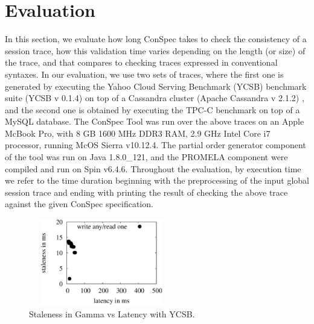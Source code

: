 \documentclass[journal,compsoc]{IEEEtran}
\begin{document}
 \section{Evaluation}\label{sec:eval}
In this section, we evaluate how long ConSpec takes to check the consistency of a  session trace, how this validation time varies depending on the length (or size) of the trace, and that compares to checking traces expressed in conventional syntaxes. In our evaluation, we use two sets of traces, where the first one is generated by executing the Yahoo Cloud Serving Benchmark (YCSB) benchmark suite (YCSB v 0.1.4)  \cite{Cooper:2010:BCS:1807128.1807152}   on top of a Cassandra cluster (Apache Cassandra v 2.1.2)  \cite{Lakshman:2010:CDS:1773912.1773922}, and the second one is obtained by executing the TPC-C benchmark on top of a MySQL database.
 The ConSpec Tool was run over the above traces on an Apple McBook Pro, with 8 GB 1600 MHz DDR3 RAM,  2.9 GHz Intel Core i7 processor, %
 running McOS Sierra v10.12.4. The partial order generator component of the tool was run on Java 1.8.0\_121, and the PROMELA component were  compiled and run on Spin v6.4.6.
 Throughout the evaluation, by execution time we refer to the time duration beginning with the preprocessing of the input global session trace and ending with printing the result of checking the above  trace against the given ConSpec specification.
 \begin{figure}%
        \includegraphics[width=2.5in,height=1.5in]
                    {oneany.eps} %
        \caption{Staleness in Gamma vs Latency with YCSB.}
        \label{fig:oneany}
\end{figure}
\end{document}
